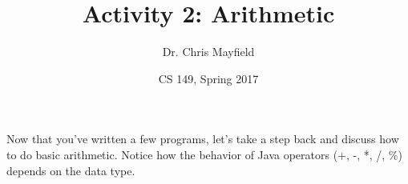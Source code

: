 \documentclass[12pt]{article}
\title{Activity 2: Arithmetic}
\author{Dr. Chris Mayfield}
\date{CS 149, Spring 2017}
\begin{document}
\maketitle

Now that you've written a few programs, let's take a step back and discuss how to do basic arithmetic.
Notice how the behavior of Java operators (+, -, *, /, \%) depends on the data type.



\newpage

\newpage

\end{document}
